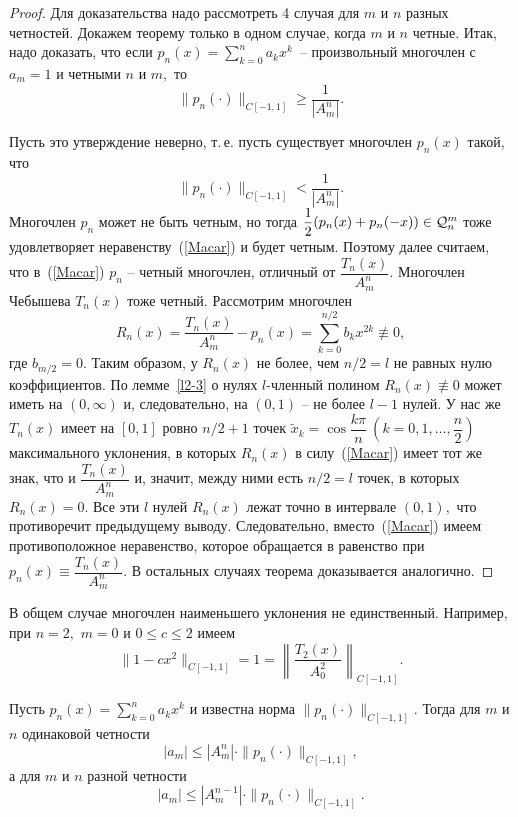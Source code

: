 \begin{proof}
Для доказательства надо рассмотреть 4 случая для $m$ и $n$ разных четностей. Докажем
{теорему только в одном случае}, когда $m$ и $n$ четные. Итак, надо доказать, что если
$p_n(x)=\sum\limits_{k=0}^n a_kx^k$~-- произвольный многочлен с $a_m=1$ {и четными
$n$ и $m,$} то
\[
  \| p_{n}(\cdot ) \|_{C[-1,1]} \ge \frac{1}{|A_m^{n}|}.
\]


Пусть это утверждение неверно, т.\,е. пусть существует многочлен
{$p_n(x)$} такой, что
\begin{equation}
\label{Macar}
  \| p_{n}(\cdot ) \|_{C[-1,1]} {<} \frac{1}{|A_m^{n}|}.
\end{equation}
{Многочлен} $p_n$ может {не} быть четным, но тогда {$\dfrac{1}{2}(p_n(x)+p_n(-x))
\in \mathcal{Q}^m_n$} тоже удовлетворяет неравенству~(\ref{Macar}) и будет четным.
{Поэтому далее считаем, что в~(\ref{Macar}) $p_n$ --} {четный многочлен, отличный от
$\dfrac{T_n(x)}{A_m^n}$.} Многочлен Чебышева $T_n(x)$ тоже четный. Рассмотрим многочлен
\[
  R_{n}(x)=\frac{T_n(x)}{A_m^{n}}-p_n(x)=
  \sum\limits_{k=0}^{n/2}b_kx^{2k}{\not\equiv 0,}
\]
{где} $b_{m/2}=0.$ Таким образом, у $R_n(x)$ не более, чем $n/2=l$ не равных нулю
коэффициентов. По {лемме~\ref{l2-3}} о нулях $l$-членный полином
{$R_n(x)\not\equiv0$} может иметь на $(0,\infty)$ и, следовательно, на $(0,1)$ -- не
более $l-1$ нулей. У нас же $T_n(x)$ имеет на $[0,1]$ ровно $n/2+1$ точек
{$\widetilde{x}_k=\cos\dfrac{k\pi}{n} \
 \left(k=0,1,\ldots,\dfrac{n}{2} \right)$} максимального уклонения, в которых
$R_n(x)$ {в силу~(\ref{Macar})} имеет тот же знак, что и $\dfrac{T_n(x)}{A_m^{n}}$ и,
значит, между ними есть $n/2=l$ точек, в которых
$R_n(x)=0.$ Все эти $l$ нулей $R_n(x)$ лежат точно в {интервале} $(0,1),$
{что противоречит предыдущему выводу.} Следовательно, вместо~(\ref{Macar})
имеем противоположное неравенство, которое обращается в равенство при
$p_n(x)\equiv\dfrac{T_n(x)}{A_m^{n}}.$ В остальных случаях теорема
доказывается аналогично.
\end{proof}

\begin{Remark}
В общем случае многочлен наименьшего уклонения не
единственный. Например, при $n=2,$ $m=0$ и $0\le c\le 2$
имеем
{$$
\|1-cx^2\|_{C[-1,1]}=1=\left\|\dfrac{T_2(x)}{A_0^2}\right\|_{C[-1,1]}.
$$}
\end{Remark}



\begin{Corollary}
Пусть $p_n(x)=\sum\limits_{k=0}^n a_kx^k$ и известна норма
$\|p_n(\cdot )\|_{C[-1,1]}.$ Тогда для $m$ и $n$ одинаковой
четности
\[
  |a_m| \le |A_m^n|\cdot  \|p_n(\cdot )\|_{C[-1,1]},
\]
{а} для $m$ и $n$ разной четности
\[
  |a_m| \le |A_m^{n-1}|\cdot  \|p_n(\cdot )\|_{C[-1,1]}.
\]
\end{Corollary}

